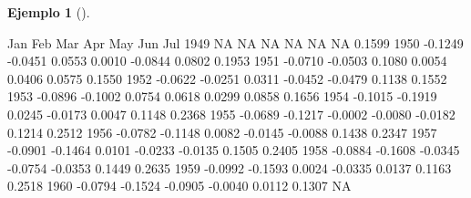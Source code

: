 \documentclass[
  us-letterpaper,
]{scrreprt}
\newenvironment{Shaded}{\begin{snugshade}}{\end{snugshade}}
\newcommand{\ConstantTok}[1]{\textcolor[rgb]{0.56,0.35,0.01}{#1}}
\newcommand{\DecValTok}[1]{\textcolor[rgb]{0.68,0.00,0.00}{#1}}
\newcommand{\FloatTok}[1]{\textcolor[rgb]{0.68,0.00,0.00}{#1}}
\newcommand{\NormalTok}[1]{\textcolor[rgb]{0.00,0.23,0.31}{#1}}
\newcommand{\SpecialCharTok}[1]{\textcolor[rgb]{0.37,0.37,0.37}{#1}}
\theoremstyle{plain}
\theoremstyle{definition}
\theoremstyle{definition}
\newtheorem{example}{Ejemplo}[chapter]
\theoremstyle{plain}
\theoremstyle{remark}
\begin{document}
\begin{example}[]
\begin{tcolorbox}
\begin{enumerate}
\begin{Shaded}
\begin{Highlighting}[]
\NormalTok{         Jan     Feb     Mar     Apr     May     Jun     Jul}
\DecValTok{1949}      \ConstantTok{NA}      \ConstantTok{NA}      \ConstantTok{NA}      \ConstantTok{NA}      \ConstantTok{NA}      \ConstantTok{NA}  \FloatTok{0.1599}
\DecValTok{1950} \SpecialCharTok{{-}}\FloatTok{0.1249} \SpecialCharTok{{-}}\FloatTok{0.0451}  \FloatTok{0.0553}  \FloatTok{0.0010} \SpecialCharTok{{-}}\FloatTok{0.0844}  \FloatTok{0.0802}  \FloatTok{0.1953}
\DecValTok{1951} \SpecialCharTok{{-}}\FloatTok{0.0710} \SpecialCharTok{{-}}\FloatTok{0.0503}  \FloatTok{0.1080}  \FloatTok{0.0054}  \FloatTok{0.0406}  \FloatTok{0.0575}  \FloatTok{0.1550}
\DecValTok{1952} \SpecialCharTok{{-}}\FloatTok{0.0622} \SpecialCharTok{{-}}\FloatTok{0.0251}  \FloatTok{0.0311} \SpecialCharTok{{-}}\FloatTok{0.0452} \SpecialCharTok{{-}}\FloatTok{0.0479}  \FloatTok{0.1138}  \FloatTok{0.1552}
\DecValTok{1953} \SpecialCharTok{{-}}\FloatTok{0.0896} \SpecialCharTok{{-}}\FloatTok{0.1002}  \FloatTok{0.0754}  \FloatTok{0.0618}  \FloatTok{0.0299}  \FloatTok{0.0858}  \FloatTok{0.1656}
\DecValTok{1954} \SpecialCharTok{{-}}\FloatTok{0.1015} \SpecialCharTok{{-}}\FloatTok{0.1919}  \FloatTok{0.0245} \SpecialCharTok{{-}}\FloatTok{0.0173}  \FloatTok{0.0047}  \FloatTok{0.1148}  \FloatTok{0.2368}
\DecValTok{1955} \SpecialCharTok{{-}}\FloatTok{0.0689} \SpecialCharTok{{-}}\FloatTok{0.1217} \SpecialCharTok{{-}}\FloatTok{0.0002} \SpecialCharTok{{-}}\FloatTok{0.0080} \SpecialCharTok{{-}}\FloatTok{0.0182}  \FloatTok{0.1214}  \FloatTok{0.2512}
\DecValTok{1956} \SpecialCharTok{{-}}\FloatTok{0.0782} \SpecialCharTok{{-}}\FloatTok{0.1148}  \FloatTok{0.0082} \SpecialCharTok{{-}}\FloatTok{0.0145} \SpecialCharTok{{-}}\FloatTok{0.0088}  \FloatTok{0.1438}  \FloatTok{0.2347}
\DecValTok{1957} \SpecialCharTok{{-}}\FloatTok{0.0901} \SpecialCharTok{{-}}\FloatTok{0.1464}  \FloatTok{0.0101} \SpecialCharTok{{-}}\FloatTok{0.0233} \SpecialCharTok{{-}}\FloatTok{0.0135}  \FloatTok{0.1505}  \FloatTok{0.2405}
\DecValTok{1958} \SpecialCharTok{{-}}\FloatTok{0.0884} \SpecialCharTok{{-}}\FloatTok{0.1608} \SpecialCharTok{{-}}\FloatTok{0.0345} \SpecialCharTok{{-}}\FloatTok{0.0754} \SpecialCharTok{{-}}\FloatTok{0.0353}  \FloatTok{0.1449}  \FloatTok{0.2635}
\DecValTok{1959} \SpecialCharTok{{-}}\FloatTok{0.0992} \SpecialCharTok{{-}}\FloatTok{0.1593}  \FloatTok{0.0024} \SpecialCharTok{{-}}\FloatTok{0.0335}  \FloatTok{0.0137}  \FloatTok{0.1163}  \FloatTok{0.2518}
\DecValTok{1960} \SpecialCharTok{{-}}\FloatTok{0.0794} \SpecialCharTok{{-}}\FloatTok{0.1524} \SpecialCharTok{{-}}\FloatTok{0.0905} \SpecialCharTok{{-}}\FloatTok{0.0040}  \FloatTok{0.0112}  \FloatTok{0.1307}      \ConstantTok{NA}

\end{Highlighting}
\end{Shaded}
\end{enumerate}
\end{tcolorbox}
\end{example}
\end{document}

